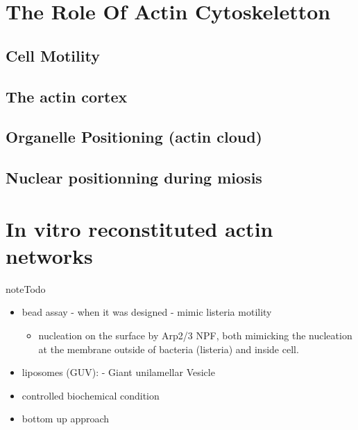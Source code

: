 \documentclass[A4paperpaper,11pt,english]{sphinxmanual}
\begin{document}
\section{The Role Of Actin Cytoskeletton}
\label{parts/part1:the-role-of-actin-cytoskeletton}

\subsection{Cell Motility}
\label{parts/part1:cell-motility}

\subsection{The actin cortex}
\label{parts/part1:the-actin-cortex}

\subsection{Organelle Positioning (actin cloud)}
\label{parts/part1:organelle-positioning-actin-cloud}

\subsection{Nuclear positionning during miosis}
\label{parts/part1:nuclear-positionning-during-miosis}

\section{In vitro reconstituted actin networks}
\label{parts/part1:in-vitro-reconstituted-actin-networks}
\begin{notice}{note}{Todo}
\begin{itemize}
\item {} 
bead assay
- when it was designed
- mimic listeria motility
\begin{itemize}
\item {} 
nucleation on the surface by Arp2/3 NPF, both mimicking the
nucleation at the membrane outside of bacteria (listeria) and inside
cell.

\end{itemize}

\item {} 
liposomes (GUV):
- Giant unilamellar Vesicle

\item {} 
controlled biochemical condition

\item {} 
bottom up approach

\end{itemize}
\end{notice}
\end{document}
